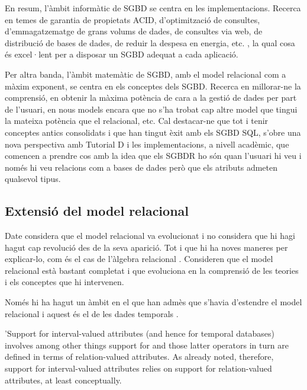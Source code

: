 En resum, l'àmbit informàtic de SGBD se centra en les implementacions. Recerca en temes de garantia de propietats ACID, d'optimització de consultes, d'emmagatzematge de grans volums de dades, de consultes via web, de distribució de bases de dades, de reduir la despesa en energia, etc. \parencite{stonebraker07,stonebraker10}, la qual cosa és excel·lent per a disposar un SGBD adequat a cada aplicació. 

Per altra banda, l'àmbit matemàtic de SGBD, amb el model relacional com a màxim exponent, se centra en els conceptes dels SGBD. Recerca en millorar-ne la comprensió, en obtenir la màxima potència de cara a la gestió de dades per part de l'usuari, en nous models encara que  no s'ha trobat cap altre model que tingui la mateixa potència que el relacional, etc. Cal destacar-ne que tot i tenir conceptes antics consolidats i que han tingut èxit amb els SGBD SQL, s'obre una nova perspectiva amb Tutorial D i les implementacions, a nivell acadèmic, que comencen a prendre cos amb la idea que els SGBDR ho són quan l'usuari hi veu i només hi veu relacions com a bases de dades  però que els atributs admeten qualsevol tipus. 






\subsection{Extensió del model relacional}

Date considera que el model relacional va evolucionat i no considera que hi hagi hagut cap revolució des de la seva aparició. Tot i que hi ha noves maneres per explicar-lo, com és el cas de l'àlgebra relacional . Consideren que el model relacional està bastant completat i que evoluciona en la comprensió de les teories i els conceptes que hi intervenen. 

Només hi ha hagut un àmbit en el que han admès que s'havia d'estendre el model relacional i aquest és el de les dades temporals .


  'Support for interval-valued attributes (and hence for temporal databases) involves among other things support for
and those latter operators in turn are defined in terms of relation-valued attributes. As already noted, therefore, support
for interval-valued attributes relies on support for relation-valued attributes, at least conceptually. 




